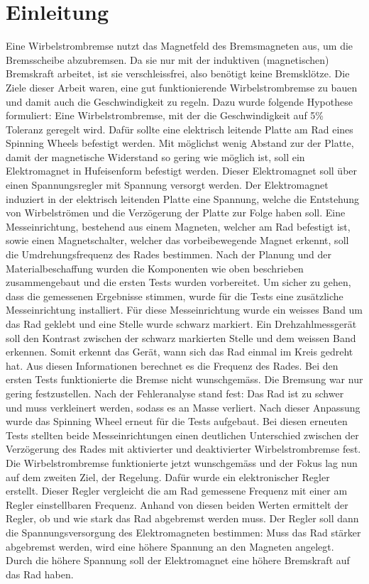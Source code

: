 \section{Einleitung}\label{cap:einleitung}
Eine Wirbelstrombremse nutzt das Magnetfeld des Bremsmagneten aus, um die Bremsscheibe abzubremsen. Da sie nur mit der induktiven (magnetischen) Bremskraft arbeitet, ist sie verschleissfrei, also benötigt keine Bremsklötze.
\newpara
 Die Ziele dieser Arbeit waren, eine gut funktionierende Wirbelstrombremse zu bauen und damit auch die Geschwindigkeit zu regeln. Dazu wurde folgende Hypothese formuliert: Eine Wirbelstrombremse, mit der die Geschwindigkeit auf 5\% Toleranz geregelt wird.
 \newpara
Dafür sollte eine elektrisch leitende Platte am Rad eines Spinning Wheels befestigt werden. Mit möglichst wenig Abstand zur der Platte, damit der magnetische Widerstand so gering wie möglich ist, soll ein Elektromagnet in Hufeisenform befestigt werden. Dieser Elektromagnet soll über einen Spannungsregler mit Spannung versorgt werden. Der Elektromagnet induziert in der elektrisch leitenden Platte eine Spannung, welche die Entstehung von Wirbelströmen und die Verzögerung der Platte zur Folge haben soll. Eine Messeinrichtung, bestehend aus einem Magneten, welcher am Rad befestigt ist, sowie einen Magnetschalter, welcher das vorbeibewegende Magnet erkennt, soll die Umdrehungsfrequenz des Rades bestimmen.
\newpara
Nach der Planung und der Materialbeschaffung wurden die Komponenten wie oben beschrieben zusammengebaut und die ersten Tests wurden vorbereitet. Um sicher zu gehen, dass die gemessenen Ergebnisse stimmen, wurde für die Tests eine zusätzliche Messeinrichtung installiert. Für diese Messeinrichtung wurde ein weisses Band um das Rad geklebt und eine Stelle wurde schwarz markiert. Ein Drehzahlmessgerät soll den Kontrast zwischen der schwarz markierten Stelle und dem weissen Band erkennen. Somit erkennt das Gerät, wann sich das Rad einmal im Kreis gedreht hat. Aus diesen Informationen berechnet es die Frequenz des Rades.
\newpara
Bei den ersten Tests funktionierte die Bremse nicht wunschgemäss. Die Bremsung war nur gering festzustellen. Nach der Fehleranalyse stand fest: Das Rad ist zu schwer und muss verkleinert werden, sodass es an Masse verliert.
\newpara
Nach dieser Anpassung wurde das Spinning Wheel erneut für die Tests aufgebaut. Bei diesen erneuten Tests stellten beide Messeinrichtungen einen deutlichen Unterschied zwischen der Verzögerung des Rades mit aktivierter und deaktivierter Wirbelstrombremse fest.
\newpara
Die Wirbelstrombremse funktionierte jetzt wunschgemäss und der Fokus lag nun auf dem zweiten Ziel, der Regelung. Dafür wurde ein elektronischer Regler erstellt. Dieser Regler vergleicht die am Rad gemessene Frequenz mit einer am Regler einstellbaren Frequenz. Anhand von diesen beiden Werten ermittelt der Regler, ob und wie stark das Rad abgebremst werden muss. Der Regler soll dann die Spannungsversorgung des Elektromagneten bestimmen: Muss das Rad stärker abgebremst werden, wird eine höhere Spannung an den Magneten angelegt. Durch die höhere Spannung soll der Elektromagnet eine höhere Bremskraft auf das Rad haben.
